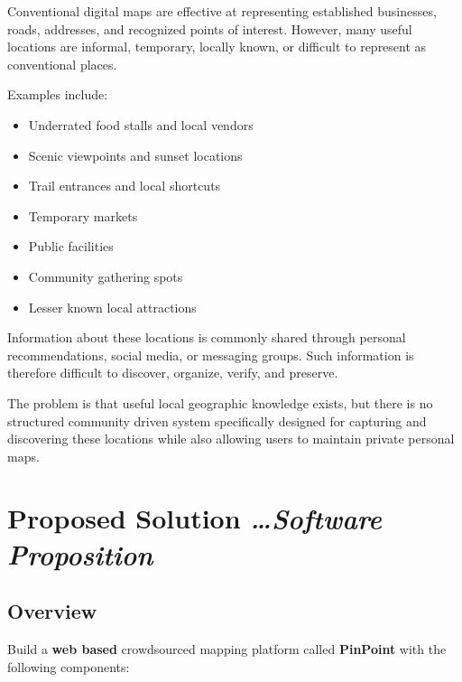 \documentclass[11pt,a4paper]{article}
\newcommand{\BvrHint}[1]{%
  {\normalfont\normalsize\itshape\hfill #1}}
\begin{document}
Conventional digital maps are effective at representing established
businesses, roads, addresses, and recognized points of interest. However,
many useful locations are informal, temporary, locally known, or difficult to
represent as conventional places.

Examples include:

\begin{itemize}[leftmargin=0.7cm]
    \item Underrated food stalls and local vendors
    \item Scenic viewpoints and sunset locations
    \item Trail entrances and local shortcuts
    \item Temporary markets
    \item Public facilities
    \item Community gathering spots
    \item Lesser known local attractions
\end{itemize}

Information about these locations is commonly shared through personal
recommendations, social media, or messaging groups. Such information is
therefore difficult to discover, organize, verify, and preserve.

The problem is that useful local geographic knowledge exists, but there is no
structured community driven system specifically designed for capturing and
discovering these locations while also allowing users to maintain private
personal maps.

\section{Proposed Solution%
  \BvrHint{\ldots Software Proposition}}

\subsection{Overview}

Build a \textbf{web based} crowdsourced mapping platform called
\textbf{PinPoint} with the following components:
\end{document}
